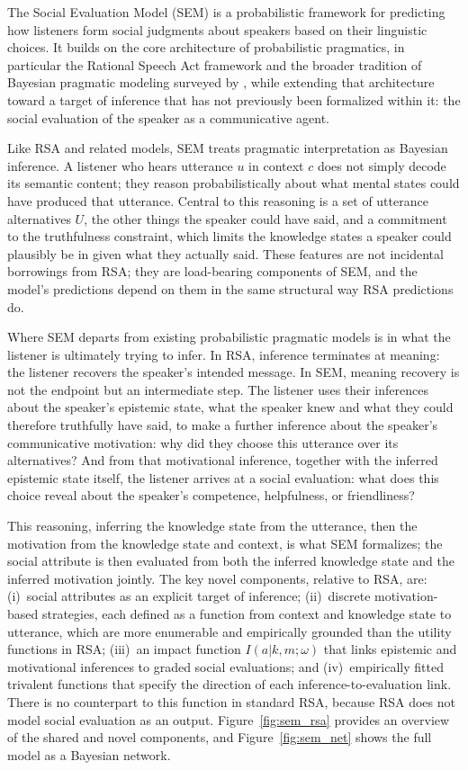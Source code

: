 \documentclass[12pt,a4paper]{article}
\begin{document}
The Social Evaluation Model (SEM) is a probabilistic framework for predicting
how listeners form social judgments about speakers based on their linguistic
choices. It builds on the core architecture of probabilistic pragmatics, in
particular the Rational Speech Act framework \citep{frank2012,goodman2016} and
the broader tradition of Bayesian pragmatic modeling surveyed by
\citet{franke2016}, while extending that architecture toward a target of
inference that has not previously been formalized within it: the social
evaluation of the speaker as a communicative agent.

Like RSA and related models, SEM treats pragmatic interpretation as Bayesian
inference. A listener who hears utterance $u$ in context $c$ does not simply
decode its semantic content; they reason probabilistically about what mental
states could have produced that utterance. Central to this reasoning is a set of
utterance alternatives $U$, the other things the speaker could have said, and
a commitment to the truthfulness constraint, which limits the knowledge states a
speaker could plausibly be in given what they actually said. These features are
not incidental borrowings from RSA; they are load-bearing components of SEM, and
the model's predictions depend on them in the same structural way RSA predictions
do.

Where SEM departs from existing probabilistic pragmatic models is in what the
listener is ultimately trying to infer. In RSA, inference terminates at meaning:
the listener recovers the speaker's intended message. In SEM, meaning recovery is
not the endpoint but an intermediate step. The listener uses their inferences
about the speaker's epistemic state, what the speaker knew and what they could
therefore truthfully have said, to make a further inference about the speaker's
communicative motivation: why did they choose this utterance over its
alternatives? And from that motivational inference, together with the inferred epistemic
state itself, the listener arrives at a social evaluation: what does this choice
reveal about the speaker's competence, helpfulness, or friendliness?

This reasoning, inferring the knowledge state from the utterance, then the
motivation from the knowledge state and context, is what SEM formalizes; the
social attribute is then evaluated from both the inferred knowledge state and the
inferred motivation jointly. The
key novel components, relative to RSA, are: (i)~social attributes as an explicit
target of inference; (ii)~discrete motivation-based strategies, each defined as a
function from context and knowledge state to utterance, which are more enumerable
and empirically grounded than the utility functions in RSA; (iii)~an impact
function $I(a|k,m;\omega)$ that links epistemic and motivational inferences to
graded social evaluations; and (iv)~empirically fitted trivalent functions that
specify the direction of each inference-to-evaluation link. There is no
counterpart to this function in standard RSA, because RSA does not model social
evaluation as an output. Figure~\ref{fig:sem_rsa} provides an overview of the
shared and novel components, and Figure~\ref{fig:sem_net} shows the full model
as a Bayesian network.
\end{document}
